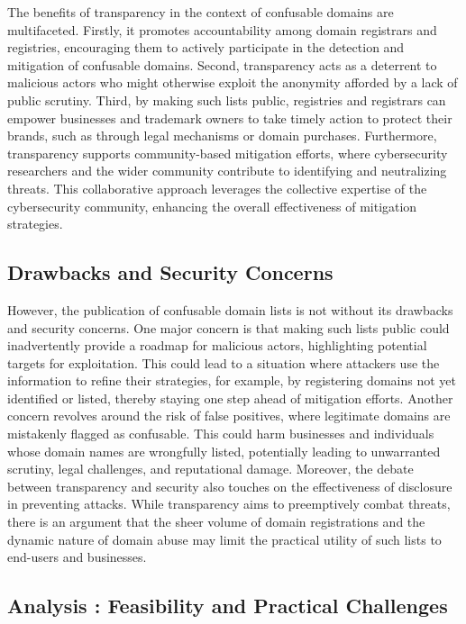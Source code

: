 The benefits of transparency in the context of confusable domains are multifaceted. Firstly, it promotes accountability among domain registrars and registries, encouraging them to actively participate in the detection and mitigation of confusable domains. Second, transparency acts as a deterrent to malicious actors who might otherwise exploit the anonymity afforded by a lack of public scrutiny. Third, by making such lists public, registries and registrars can empower businesses and trademark owners to take timely action to protect their brands, such as through legal mechanisms or domain purchases. Furthermore, transparency supports community-based mitigation efforts, where cybersecurity researchers and the wider community contribute to identifying and neutralizing threats. This collaborative approach leverages the collective expertise of the cybersecurity community, enhancing the overall effectiveness of mitigation strategies.

\subsection{Drawbacks and Security Concerns} 

However, the publication of confusable domain lists is not without its drawbacks and security concerns. One major concern is that making such lists public could inadvertently provide a roadmap for malicious actors, highlighting potential targets for exploitation. This could lead to a situation where attackers use the information to refine their strategies, for example, by registering domains not yet identified or listed, thereby staying one step ahead of mitigation efforts. Another concern revolves around the risk of false positives, where legitimate domains are mistakenly flagged as confusable. This could harm businesses and individuals whose domain names are wrongfully listed, potentially leading to unwarranted scrutiny, legal challenges, and reputational damage. Moreover, the debate between transparency and security also touches on the effectiveness of disclosure in preventing attacks. While transparency aims to preemptively combat threats, there is an argument that the sheer volume of domain registrations and the dynamic nature of domain abuse may limit the practical utility of such lists to end-users and businesses.

\subsection{ Analysis : Feasibility and Practical Challenges}

